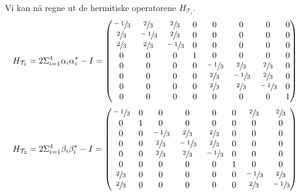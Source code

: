         Vi kan nå regne ut de hermitiske operatorene $H_{\mathcal{T}_i}$.
        \begin{align*}
            H_{\mathcal{T}_1} & = 2\Sigma_{i=1}^4\alpha_i\alpha_i^*-I = 
            \begin{pmatrix}
                \sfrac{-1}{3} & \sfrac{2}{3} & \sfrac{2}{3} & 0 & 0 & 0 & 0 & 0 \\
                \sfrac{2}{3} & \sfrac{-1}{3} & \sfrac{2}{3} & 0 & 0 & 0 & 0 & 0 \\
                \sfrac{2}{3} & \sfrac{2}{3} & \sfrac{-1}{3} & 0 & 0 & 0 & 0 & 0 \\
                0 & 0 & 0 & 1 & 0 & 0 & 0 & 0 \\
                0 & 0 & 0 & 0 & \sfrac{-1}{3} & \sfrac{2}{3} & \sfrac{2}{3} & 0 \\
                0 & 0 & 0 & 0 & \sfrac{2}{3} & \sfrac{-1}{3} & \sfrac{2}{3} & 0 \\
                0 & 0 & 0 & 0 & \sfrac{2}{3} & \sfrac{2}{3} & \sfrac{-1}{3} & 0 \\
                0 & 0 & 0 & 0 & 0 & 0 & 0 & 1 \\
            \end{pmatrix}
        \end{align*}
        \begin{align*}
            H_{\mathcal{T}_2} & = 2\Sigma_{i=1}^4\beta_i\beta_i^*-I = \begin{pmatrix}
                \sfrac{-1}{3} & 0 & 0 & 0 & 0 & 0 & \sfrac{2}{3} & \sfrac{2}{3} \\
                0 & 1 & 0 & 0 & 0 & 0 & 0 & 0 \\
                0 & 0 & \sfrac{-1}{3} & \sfrac{2}{3} & \sfrac{2}{3} & 0 & 0 & 0 \\
                0 & 0 & \sfrac{2}{3} & \sfrac{-1}{3} & \sfrac{2}{3} & 0 & 0 & 0 \\
                0 & 0 & \sfrac{2}{3} & \sfrac{2}{3} & \sfrac{-1}{3} & 0 & 0 & 0 \\
                0 & 0 & 0 & 0 & 0 & 1 & 0 & 0 \\
                \sfrac{2}{3} & 0 & 0 & 0 & 0 & 0 & \sfrac{-1}{3} & \sfrac{2}{3} \\
                \sfrac{2}{3} & 0 & 0 & 0 & 0 & 0 & \sfrac{2}{3} & \sfrac{-1}{3}
            \end{pmatrix}
        \end{align*}
